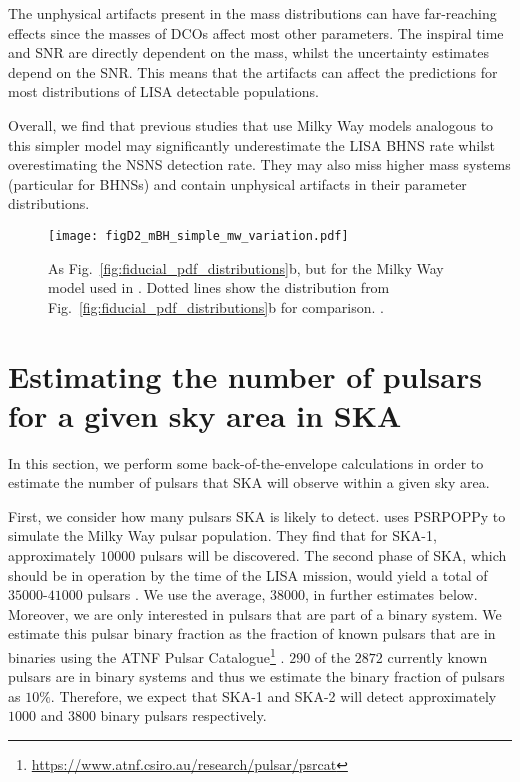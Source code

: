 The unphysical artifacts present in the mass distributions can have far-reaching effects since the masses of DCOs affect most other parameters. The inspiral time and SNR are directly dependent on the mass, whilst the uncertainty estimates depend on the SNR. This means that the artifacts can affect the predictions for most distributions of LISA detectable populations.

Overall, we find that previous studies that use Milky Way models analogous to this simpler model may significantly underestimate the LISA BHNS rate whilst overestimating the NSNS detection rate. They may also miss higher mass systems (particular for BHNSs) and contain unphysical artifacts in their parameter distributions.

\begin{figure}[htb]
    \centering
    \texttt{[image: figD2\_mBH\_simple\_mw\_variation.pdf]}
    \caption{As Fig.~\ref{fig:fiducial_pdf_distributions}b, but for the Milky Way model used in \citet{Breivik+2020}. Dotted lines show the distribution from Fig.~\ref{fig:fiducial_pdf_distributions}b for comparison. \href{https://github.com/TomWagg/detecting-DCOs-in-LISA/blob/main/paper/figures/figD2_mBH_simple_mw_variation.pdf}{\faFileImage} \href{https://github.com/TomWagg/detecting-DCOs-in-LISA/blob/main/paper/figure_notebooks/fiducial.ipynb}{\faBook}.}
    \label{fig:bh_mass_simple_mw}
\end{figure}

\section{Estimating the number of pulsars for a given sky area in SKA}\label{app:ska_area}

In this section, we perform some back-of-the-envelope calculations in order to estimate the number of pulsars that SKA will observe within a given sky area.

First, we consider how many pulsars SKA is likely to detect. \citet{Keane+2015} uses PSRPOPPy \citep{Bates+2014} to simulate the Milky Way pulsar population. They find that for SKA-1, approximately $10000$ pulsars will be discovered. The second phase of SKA, which should be in operation by the time of the LISA mission, would yield a total of $35000$-$41000$ pulsars \citep{Keane+2015}. We use the average, $38000$, in further estimates below. Moreover, we are only interested in pulsars that are part of a binary system. We estimate this pulsar binary fraction as the fraction of known pulsars that are in binaries using the ATNF Pulsar Catalogue\footnote{\url{https://www.atnf.csiro.au/research/pulsar/psrcat}} \citep{Manchester+2005}. $290$ of the $2872$ currently known pulsars are in binary systems and thus we estimate the binary fraction of pulsars as $10\%$. Therefore, we expect that SKA-1 and SKA-2 will detect approximately $1000$ and $3800$ binary pulsars respectively.

